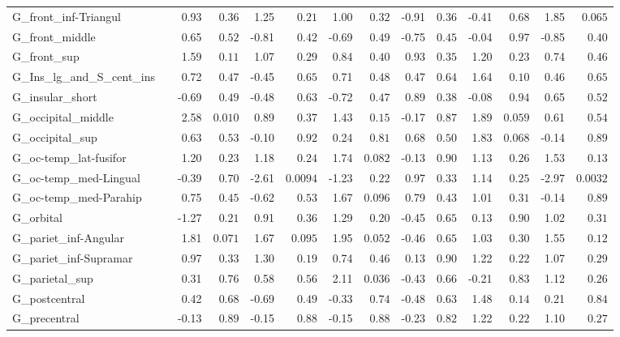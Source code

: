 {\begin{longtable}{llrrrrrrrrrrrr}
G\_front\_inf-Triangul &  & 0.93 & $0.36$ & 1.25 & $0.21$ & 1.00 & $0.32$ & -0.91 & $0.36$ & -0.41 & $0.68$ & 1.85 & $0.065$ \\
G\_front\_middle &  & 0.65 & $0.52$ & -0.81 & $0.42$ & -0.69 & $0.49$ & -0.75 & $0.45$ & -0.04 & $0.97$ & -0.85 & $0.40$ \\
G\_front\_sup &  & 1.59 & $0.11$ & 1.07 & $0.29$ & 0.84 & $0.40$ & 0.93 & $0.35$ & 1.20 & $0.23$ & 0.74 & $0.46$ \\
G\_Ins\_lg\_and\_S\_cent\_ins &  & 0.72 & $0.47$ & -0.45 & $0.65$ & 0.71 & $0.48$ & 0.47 & $0.64$ & 1.64 & $0.10$ & 0.46 & $0.65$ \\
G\_insular\_short &  & -0.69 & $0.49$ & -0.48 & $0.63$ & -0.72 & $0.47$ & 0.89 & $0.38$ & -0.08 & $0.94$ & 0.65 & $0.52$ \\
G\_occipital\_middle &  & 2.58 & $0.010$ & 0.89 & $0.37$ & 1.43 & $0.15$ & -0.17 & $0.87$ & 1.89 & $0.059$ & 0.61 & $0.54$ \\
G\_occipital\_sup &  & 0.63 & $0.53$ & -0.10 & $0.92$ & 0.24 & $0.81$ & 0.68 & $0.50$ & 1.83 & $0.068$ & -0.14 & $0.89$ \\
G\_oc-temp\_lat-fusifor &  & 1.20 & $0.23$ & 1.18 & $0.24$ & 1.74 & $0.082$ & -0.13 & $0.90$ & 1.13 & $0.26$ & 1.53 & $0.13$ \\
G\_oc-temp\_med-Lingual &  & -0.39 & $0.70$ & -2.61 & $0.0094$ & -1.23 & $0.22$ & 0.97 & $0.33$ & 1.14 & $0.25$ & -2.97 & $0.0032$ \\
G\_oc-temp\_med-Parahip &  & 0.75 & $0.45$ & -0.62 & $0.53$ & 1.67 & $0.096$ & 0.79 & $0.43$ & 1.01 & $0.31$ & -0.14 & $0.89$ \\
G\_orbital &  & -1.27 & $0.21$ & 0.91 & $0.36$ & 1.29 & $0.20$ & -0.45 & $0.65$ & 0.13 & $0.90$ & 1.02 & $0.31$ \\
G\_pariet\_inf-Angular &  & 1.81 & $0.071$ & 1.67 & $0.095$ & 1.95 & $0.052$ & -0.46 & $0.65$ & 1.03 & $0.30$ & 1.55 & $0.12$ \\
G\_pariet\_inf-Supramar &  & 0.97 & $0.33$ & 1.30 & $0.19$ & 0.74 & $0.46$ & 0.13 & $0.90$ & 1.22 & $0.22$ & 1.07 & $0.29$ \\
G\_parietal\_sup &  & 0.31 & $0.76$ & 0.58 & $0.56$ & 2.11 & $0.036$ & -0.43 & $0.66$ & -0.21 & $0.83$ & 1.12 & $0.26$ \\
G\_postcentral &  & 0.42 & $0.68$ & -0.69 & $0.49$ & -0.33 & $0.74$ & -0.48 & $0.63$ & 1.48 & $0.14$ & 0.21 & $0.84$ \\
G\_precentral &  & -0.13 & $0.89$ & -0.15 & $0.88$ & -0.15 & $0.88$ & -0.23 & $0.82$ & 1.22 & $0.22$ & 1.10 & $0.27$ \\

\end{longtable}}
